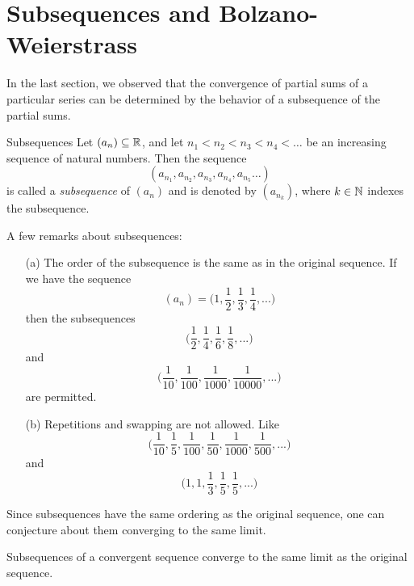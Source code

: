 \section{Subsequences and Bolzano-Weierstrass}

In the last section, we observed that the convergence of partial sums of a particular series can be determined by the behavior of a subsequence of the partial sums. 

\begin{definition}{Subsequences}{}
Let \( (a_n) \subseteq \mathbb{R} \), and let \( n_1 < n_2 < n_3 < n_4 < \dots\) be an increasing sequence of natural numbers. Then the sequence 
\[ (a_{n_1}, a_{n_2}, a_{n_3}, a_{n_4}, a_{n_5} \dots)\]
is called a \textit{subsequence} of \( (a_n)\) and is denoted by \( (a_{n_k})\), where \( k \in \mathbb{N} \) indexes the subsequence.
\end{definition}%

A few remarks about subsequences: 

\begin{example}{}{}
\begin{enumerate}
    \item[(a)] The order of the subsequence is the same as in the original sequence.
        If we have the sequence  
        \[ (a_n) = \Big( 1, \frac{1}{2}, \frac{1}{3}, \frac{1}{4}, ...\Big)\]
        then the subsequences 
        \[ \Big( \frac{1}{2}, \frac{1}{4}, \frac{1}{6}, \frac{1}{8},... \Big)\]
        and 
        \[ \Big( \frac{1}{10}, \frac{1}{100}, \frac{1}{1000}, \frac{1}{10000}, ...\Big)\]
        are permitted.
        
    \item[(b)] Repetitions and swapping are not allowed.
        Like 
        \[ \Big( \frac{1}{10}, \frac{1}{5}, \frac{1}{100}, \frac{1}{50}, \frac{1}{1000}, \frac{1}{500},...\Big)\] 
        and 
        \[ \Big( 1,1, \frac{1}{3}, \frac{1}{5}, \frac{1}{5}, ...\Big)\]
        
\end{enumerate}
\end{example}


Since subsequences have the same ordering as the original sequence, one can conjecture about them converging to the same limit. 

\begin{theorem}{}{}
Subsequences of a convergent sequence converge to the same limit as the original sequence.
\end{theorem}

